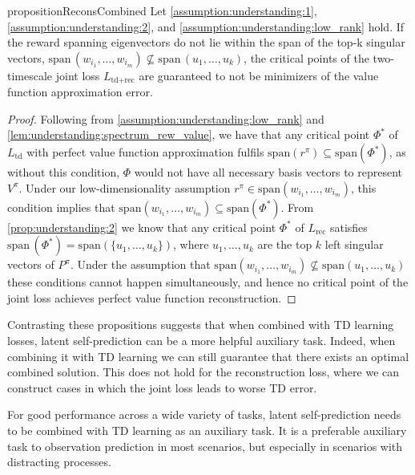 \begin{restatable}{proposition}{ReconsCombined}
    Let \autoref{assumption:understanding:1}, \autoref{assumption:understanding:2}, and \autoref{assumption:understanding:low_rank} hold. If the reward spanning eigenvectors do not lie within the span of the top-k singular vectors, $\mathrm{span}\,(w_{i_1},\dots,w_{i_m}) \not\subseteq \mathrm{span}\,(u_1,\dots,u_k)$, the critical points of the two-timescale joint loss $L_{\text{td}+\text{rec}}$ are guaranteed to not be minimizers of the value function approximation error. 
\end{restatable}
\begin{proof}
    Following from \autoref{assumption:understanding:low_rank} and \cref{lem:understanding:spectrum_rew_value}, we have that any critical point $\Phi^*$ of $L_\text{td}$ with perfect value function approximation fulfils $\mathrm{span}(r^\pi)\subseteq \mathrm{span}(\Phi^*)$, as without this condition, $\Phi$ would not have all necessary basis vectors to represent $V^\pi$. Under our low-dimensionality assumption $r^\pi \in \mathrm{span}(w_{i_1},\dots,w_{i_m})$, this condition implies that $\mathrm{span}(w_{i_1},\dots,w_{i_m})\subseteq \mathrm{span}(\Phi^*)$. From \cref{prop:understanding:2} we know that any critical point $\Phi^*$ of $L_\text{rec}$ satisfies $\mathrm{span}\,({\Phi^*})=\mathrm{span}\left(\{u_1,\dots,u_k\}\right)$, where $u_1,\dots,u_k$ are the top $k$ left singular vectors of $P^\pi$. Under the assumption that $\mathrm{span}(w_{i_1},\dots,w_{i_m}) \not\subseteq \mathrm{span}(u_1,\dots,u_k)$ these conditions cannot happen simultaneously, and hence no critical point of the joint loss achieves perfect value function reconstruction.
\end{proof}


Contrasting these propositions suggests that when combined with TD learning losses, latent self-prediction can be a more helpful auxiliary task. Indeed, when combining it with TD learning we can still guarantee that there exists an optimal combined solution.
This does not hold for the reconstruction loss, where we can construct cases in which the joint loss leads to worse TD error.

\begin{tcolorbox}[boxrule=0.2mm,colback=white,colframe=uoftblue,boxsep=0pt,top=3pt,bottom=5pt]
\begin{insight} 
For good performance across a wide variety of tasks, latent self-prediction needs to be combined with TD learning as an auxiliary task. It is a preferable auxiliary task to observation prediction in most scenarios, but especially in scenarios with distracting processes.
\label{insight:understanding:3}
\end{insight}
\end{tcolorbox}

